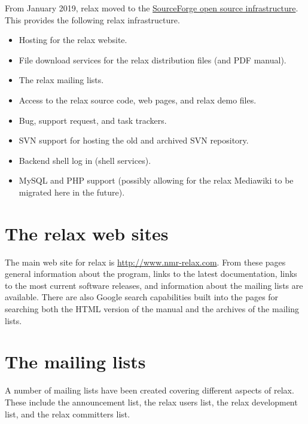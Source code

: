 From January 2019, relax moved to the \href{https://sourceforge.net/projects/nmr-relax/}{SourceForge open source infrastructure}.  This provides the following relax infrastructure.
\begin{itemize}
    \item Hosting for the relax website.
    \item File download services for the relax distribution files (and PDF manual).
    \item The relax mailing lists.
    \item Access to the relax source code, web pages, and relax demo files.
    \item Bug, support request, and task trackers.
    \item SVN support for hosting the old and archived SVN repository.
    \item Backend shell log in (shell services).
    \item MySQL and PHP support (possibly allowing for the relax Mediawiki to be migrated here in the future).
\end{itemize}




\section{The relax web sites}

The main web site for relax is \href{http://www.nmr-relax.com}{http://www.nmr-relax.com}.
From these pages general information about the program, links to the latest documentation, links to the most current software releases, and information about the mailing lists are available.
There are also Google search capabilities built into the pages for searching both the HTML version of the manual and the archives of the mailing lists.




\section{The mailing lists}

A number of mailing lists have been created covering different aspects of relax.
These include the announcement list, the relax users list, the relax development list, and the relax committers list.


